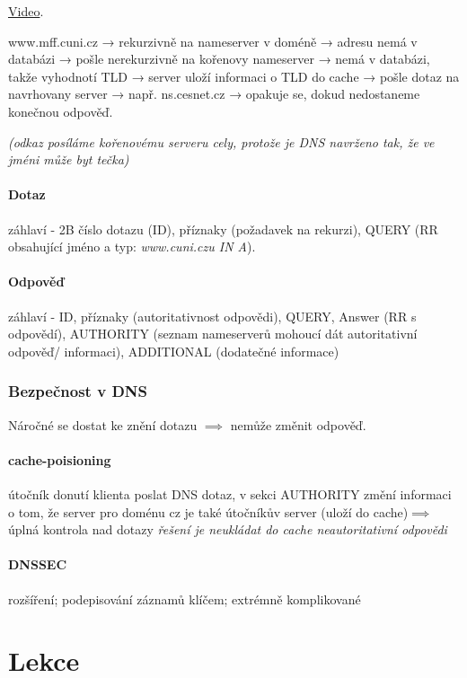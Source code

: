 \documentclass[10pt,a4paper]{article}
\begin{document}
\href{https://youtu.be/mpQZVYPuDGU}{Video}.

www.mff.cuni.cz → rekurzivně na nameserver v doméně → adresu nemá v databázi → pošle nerekurzivně na kořenovy nameserver → nemá v databázi, takže vyhodnotí TLD → server uloží informaci o TLD do cache → pošle dotaz na navrhovany server → např. ns.cesnet.cz → opakuje se, dokud nedostaneme konečnou odpověď.

\textit{(odkaz posíláme kořenovému serveru cely, protože je DNS navrženo tak, že ve jméni může byt tečka)}

\paragraph{Dotaz} záhlaví - 2B číslo dotazu (ID), příznaky (požadavek na rekurzi), QUERY (RR obsahující jméno a typ: \textit{www.cuni.czu IN A}).

\paragraph{Odpověď} záhlaví - ID, příznaky (autoritativnost odpovědi), QUERY, Answer (RR s odpovědí), AUTHORITY (seznam nameserverů mohoucí dát autoritativní odpověď/ informaci), ADDITIONAL (dodatečné informace)

\subsubsection{Bezpečnost v DNS}

Náročné se dostat ke znění dotazu $\implies$ nemůže změnit odpověď.

\paragraph{cache-poisioning} útočník donutí klienta poslat DNS dotaz, v sekci AUTHORITY změní informaci o tom, že server pro doménu cz je také útočníkův server (uloží do cache)$\implies$ úplná kontrola nad dotazy
\textit{řešení je neukládat do cache neautoritativní odpovědi}

\paragraph{DNSSEC} rozšíření; podepisování záznamů klíčem; extrémně komplikované

\newpage

\section{Lekce}
\end{document}
